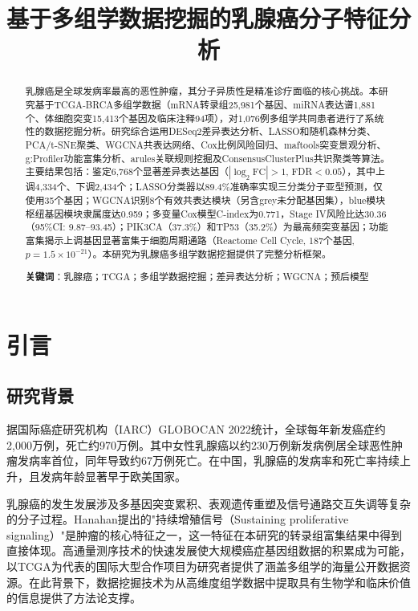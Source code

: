 \documentclass[12pt,a4paper]{ctexart}
\title{\heiti\zihao{3} 基于多组学数据挖掘的乳腺癌分子特征分析}
\author{}
\date{}
\begin{document}
\maketitle

\begin{abstract}
\noindent 乳腺癌是全球发病率最高的恶性肿瘤，其分子异质性是精准诊疗面临的核心挑战。本研究基于TCGA-BRCA多组学数据（mRNA转录组25,981个基因、miRNA表达谱1,881个、体细胞突变15,413个基因及临床注释94项），对1,076例多组学共同患者进行了系统性的数据挖掘分析。研究综合运用DESeq2差异表达分析、LASSO和随机森林分类、PCA/t-SNE聚类、WGCNA共表达网络、Cox比例风险回归、maftools突变景观分析、g:Profiler功能富集分析、arules关联规则挖掘及ConsensusClusterPlus共识聚类等算法。主要结果包括：鉴定6,768个显著差异表达基因（$|\log_2\text{FC}|>1$, FDR$<0.05$），其中上调4,334个、下调2,434个；LASSO分类器以89.4\%准确率实现三分类分子亚型预测，仅使用35个基因；WGCNA识别8个有效共表达模块（另含grey未分配基因集），blue模块枢纽基因模块隶属度达0.959；多变量Cox模型C-index为0.771，Stage IV风险比达30.36（95\%CI: 9.87--93.45）；PIK3CA（37.3\%）和TP53（35.2\%）为最高频突变基因；功能富集揭示上调基因显著富集于细胞周期通路（Reactome Cell Cycle, 187个基因, $p=1.5\times10^{-21}$）。本研究为乳腺癌多组学数据挖掘提供了完整分析框架。

\vspace{1em}
\noindent\textbf{关键词}：乳腺癌；TCGA；多组学数据挖掘；差异表达分析；WGCNA；预后模型
\end{abstract}

\newpage

\section{引言}

\subsection{研究背景}
据国际癌症研究机构（IARC）GLOBOCAN 2022统计，全球每年新发癌症约2,000万例，死亡约970万例\cite{sung2024global}。其中女性乳腺癌以约230万例新发病例居全球恶性肿瘤发病率首位，同年导致约67万例死亡。在中国，乳腺癌的发病率和死亡率持续上升，且发病年龄显著早于欧美国家。

乳腺癌的发生发展涉及多基因突变累积、表观遗传重塑及信号通路交互失调等复杂的分子过程\cite{hanahan2011hallmarks}。Hanahan提出的"持续增殖信号（Sustaining proliferative signaling）"是肿瘤的核心特征之一\cite{hanahan2011hallmarks}，这一特征在本研究的转录组富集结果中得到直接体现。高通量测序技术的快速发展使大规模癌症基因组数据的积累成为可能，以TCGA\cite{tcga2012comprehensive}为代表的国际大型合作项目为研究者提供了涵盖多组学的海量公开数据资源。在此背景下，数据挖掘技术为从高维度组学数据中提取具有生物学和临床价值的信息提供了方法论支撑。
\end{document}
